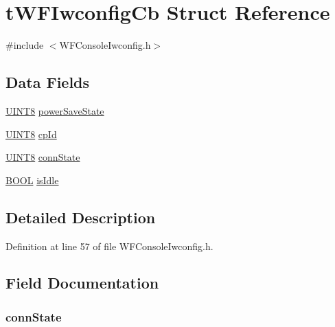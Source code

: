 \hypertarget{structt_w_f_iwconfig_cb}{}\section{t\+W\+F\+Iwconfig\+Cb Struct Reference}
\label{structt_w_f_iwconfig_cb}


{\ttfamily \#include $<$W\+F\+Console\+Iwconfig.\+h$>$}

\subsection*{Data Fields}
\begin{DoxyCompactItemize}
\item 
\hyperlink{_generic_type_defs_8h_ab27e9918b538ce9d8ca692479b375b6a}{U\+I\+N\+T8} \hyperlink{structt_w_f_iwconfig_cb_a5f0b28ce8199e905267ddcba3987c359}{power\+Save\+State}
\item 
\hyperlink{_generic_type_defs_8h_ab27e9918b538ce9d8ca692479b375b6a}{U\+I\+N\+T8} \hyperlink{structt_w_f_iwconfig_cb_a1cc90f47e8f45a728abe46627fb6b067}{cp\+Id}
\item 
\hyperlink{_generic_type_defs_8h_ab27e9918b538ce9d8ca692479b375b6a}{U\+I\+N\+T8} \hyperlink{structt_w_f_iwconfig_cb_a1eda10773054cccc042a147afc26bbad}{conn\+State}
\item 
\hyperlink{_generic_type_defs_8h_a54d65c7fa62e62c9754371e42f5111b9}{B\+O\+O\+L} \hyperlink{structt_w_f_iwconfig_cb_a91bbb925efdef20673245a84698f105d}{is\+Idle}
\end{DoxyCompactItemize}


\subsection{Detailed Description}


Definition at line 57 of file W\+F\+Console\+Iwconfig.\+h.



\subsection{Field Documentation}
\hypertarget{structt_w_f_iwconfig_cb_a1eda10773054cccc042a147afc26bbad}{}
\subsubsection[{conn\+State}]{ conn\+State}\label{structt_w_f_iwconfig_cb_a1eda10773054cccc042a147afc26bbad}


